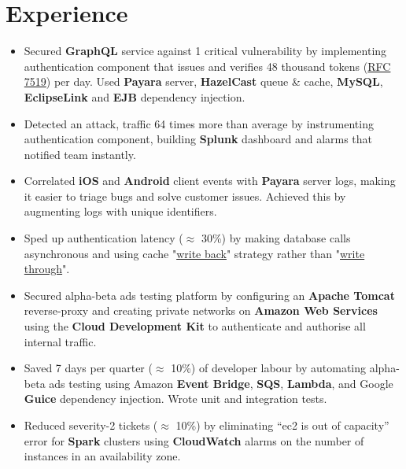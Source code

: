 \section{Experience}
\begin{itemize}[leftmargin=*]
    \item {
        Secured \textbf{GraphQL} service against 1 critical vulnerability by implementing authentication component that issues and verifies 48 thousand tokens (\href{https://datatracker.ietf.org/doc/html/rfc7519}{RFC 7519}) per day. Used \textbf{Payara} server, \textbf{HazelCast} queue \& cache, \textbf{MySQL}, \textbf{EclipseLink} and \textbf{EJB} dependency injection.
    }
    \item {
        Detected an attack, traffic 64 times more than average by instrumenting authentication component, building \textbf{Splunk} dashboard and alarms that notified team instantly.
    }
    \item {
        Correlated \textbf{iOS} and \textbf{Android} client events with \textbf{Payara} server logs, making it easier to triage bugs and solve customer issues. Achieved this by augmenting logs with unique identifiers.
    }
    \item {
        Sped up authentication latency ($\approx$ 30\%) by making database calls asynchronous and using cache "\href{https://en.wikipedia.org/wiki/Cache_(computing)#Writing_policies}{write back}" strategy rather than "\href{https://en.wikipedia.org/wiki/Cache_(computing)#Writing_policies}{write through}".
    }
\end{itemize}

\begin{itemize}[leftmargin=*]
    \item {
        Secured alpha-beta ads testing platform by configuring an \textbf{Apache Tomcat} reverse-proxy and creating private networks on \textbf{Amazon Web Services} using the \textbf{Cloud Development Kit} to authenticate and authorise all internal traffic.
    }
    \item {
        Saved 7 days per quarter ($\approx$ 10\%) of developer labour by automating alpha-beta ads testing using Amazon \textbf{Event Bridge}, \textbf{SQS}, \textbf{Lambda}, and Google \textbf{Guice} dependency injection. Wrote unit and integration tests.
    }
    \item {
        Reduced severity-2 tickets ($\approx$ 10\%) by eliminating “ec2 is out of capacity” error for \textbf{Spark} clusters using \textbf{CloudWatch} alarms on the number of instances in an availability zone.
    }
\end{itemize}

